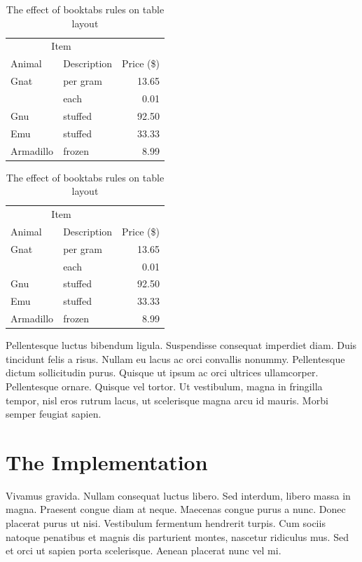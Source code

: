 \documentclass[a4paper,12pt]{book}
\begin{document}
\begin{table}[htbp]
\begin{center}
\begin{tabular}{@{}llr@{}} \toprule
\multicolumn{2}{c}{Item} \\ \cmidrule(r){1-2}
Animal & Description & Price (\$)\\ \midrule
Gnat  & per gram  & 13.65 \\
      & each      & 0.01 \\
Gnu   & stuffed   & 92.50 \\
Emu   & stuffed   & 33.33 \\
Armadillo & frozen & 8.99 \\ \bottomrule
\end{tabular}
\end{center}

\begin{center}
\begin{tabular}{@{}llr@{}} \toprule
\multicolumn{2}{c}{Item} \\ \cmidrule(r){1-2}
Animal & Description & Price (\$)\\ \midrule
Gnat  & per gram  & 13.65 \\
      & each      & 0.01 \\
Gnu   & stuffed   & 92.50 \\
Emu   & stuffed   & 33.33 \\
Armadillo & frozen & 8.99 \\ \bottomrule
\end{tabular}
\end{center}
\caption{The effect of booktabs rules on table layout}
\end{table}

Pellentesque luctus bibendum ligula. Suspendisse
consequat imperdiet diam. Duis tincidunt felis a risus. Nullam eu
lacus ac orci convallis nonummy. Pellentesque dictum sollicitudin
purus. Quisque ut ipsum ac orci ultrices ullamcorper. Pellentesque
ornare. Quisque vel tortor. Ut vestibulum, magna in fringilla tempor,
nisl eros rutrum lacus, ut scelerisque magna arcu id mauris. Morbi
semper feugiat sapien.


\section{The Implementation}


Vivamus gravida. Nullam consequat luctus libero. Sed interdum, libero
massa in magna. Praesent congue diam at neque. Maecenas congue purus a
nunc. Donec placerat purus ut nisi. Vestibulum fermentum hendrerit
turpis. Cum sociis natoque penatibus et magnis dis parturient montes,
nascetur ridiculus mus. Sed et orci ut sapien porta
scelerisque. Aenean placerat nunc vel mi. 
\end{document}

